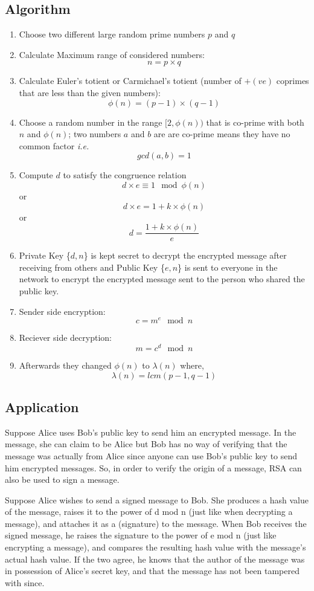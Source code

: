 \subsection{Algorithm}
\begin{enumerate}
\item Choose two different large random prime numbers $p$ and $q$
\item Calculate Maximum range of considered numbers: $$ n = p \times q $$
\item Calculate Euler's totient or Carmichael's totient (number of $+(ve)$ coprimes that are less than the given numbers): $$ \phi(n) = (p - 1) \times (q - 1) $$
\item Choose a random number in the range $[2, \phi(n))$ that is co-prime with both $n$ and $\phi(n)$; two numbers $a$ and $b$ are are co-prime means they have no common factor \textit{i.e.} $$ gcd(a, b) = 1 $$
\item Compute $d$ to satisfy the congruence relation
$$ d \times e \equiv 1 \mod \phi(n) $$
or $$ d \times e = 1 + k \times \phi(n) $$
or $$ d = \frac{1 + k \times \phi(n)}{e} $$
\item Private Key \{$d, n$\} is kept secret to decrypt the encrypted message after receiving from others and Public Key \{$e, n$\} is sent to everyone in the network to encrypt the encrypted message sent to the person who shared the public key.
\item Sender side encryption:
$$ c = m ^ e \mod n $$
\item Reciever side decryption:
$$ m = c ^ d \mod n $$
\item Afterwards they changed $\phi(n)$ to $\lambda(n)$ where,
$$ \lambda(n) = lcm(p - 1, q - 1) $$

\end{enumerate}

\subsection{Application}
Suppose Alice uses Bob's public key to send him an encrypted message. In the message, she can claim to be Alice but Bob has no way of verifying that the message was actually from Alice since anyone can use Bob's public key to send him encrypted messages. So, in order to verify the origin of a message, RSA can also be used to sign a message.

Suppose Alice wishes to send a signed message to Bob. She produces a hash value of the message, raises it to the power of d mod n (just like when decrypting a message), and attaches it as a \q(signature) to the message. When Bob receives the signed message, he raises the signature to the power of e mod n (just like encrypting a message), and compares the resulting hash value with the message's actual hash value. If the two agree, he knows that the author of the message was in possession of Alice's secret key, and that the message has not been tampered with since.

